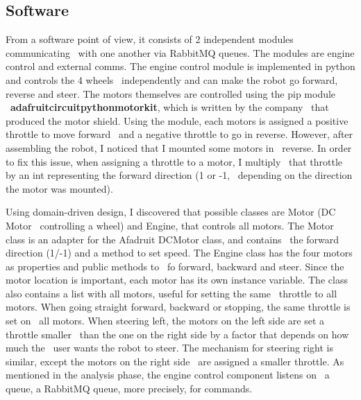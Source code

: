 \subsection{Software}
\label{subsec:implementation-robot-software}

From a software point of view, it consists of 2 independent modules communicating \
with one another via RabbitMQ queues.
The modules are engine control and external comms.
The engine control module is implemented in python and controls the 4 wheels \
independently and can make the robot go forward, reverse and steer.
The motors themselves are controlled using the pip module \
\textbf{adafruit\-circuitpython\-motorkit}, which is written by the company \
that produced the motor shield.
Using the module, each motors is assigned a positive throttle to move forward \
and a negative throttle to go in reverse.
However, after assembling the robot, I noticed that I mounted some motors in \
reverse.
In order to fix this issue, when assigning a throttle to a motor, I multiply \
that throttle by an int representing the forward direction (1 or -1, \
depending on the direction the motor was mounted).

Using domain-driven design, I discovered that possible classes are Motor (DC Motor \
controlling a wheel) and Engine, that controls all motors.
The Motor class is an adapter for the Afadruit DCMotor class, and contains \
the forward direction (1/-1) and a method to set speed.
The Engine class has the four motors as properties and public methods to \
fo forward, backward and steer.
Since the motor location is important, each motor has its own instance variable.
The class also contains a list with all motors, useful for setting the same \
throttle to all motors.
When going straight forward, backward or stopping, the same throttle is set on \
all motors.
When steering left, the motors on the left side are set a throttle smaller \
than the one on the right side by a factor that depends on how much the \
user wants the robot to steer.
The mechanism for steering right is similar, except the motors on the right side \
are assigned a smaller throttle.
As mentioned in the analysis phase, the engine control component listens on \
a queue, a RabbitMQ queue, more precisely, for commands.

